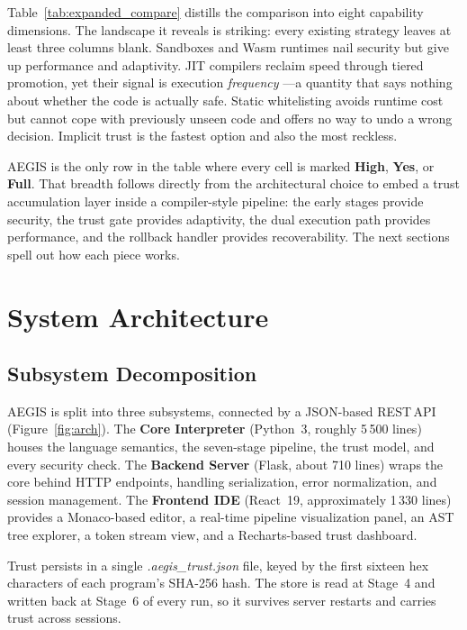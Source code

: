 \documentclass[conference]{IEEEtran}
\begin{document}
Table~\ref{tab:expanded_compare} distills the comparison into
eight capability dimensions.  The landscape it reveals is
striking: every existing strategy leaves at least three columns
blank.  Sandboxes and Wasm runtimes nail security but give up
performance and adaptivity.  JIT compilers reclaim speed through
tiered promotion, yet their signal is execution \emph{frequency}
---a quantity that says nothing about whether the code is
actually safe.  Static whitelisting avoids runtime cost but
cannot cope with previously unseen code and offers no way to
undo a wrong decision.  Implicit trust is the fastest option
and also the most reckless.

AEGIS is the only row in the table where every cell is marked
\textbf{High}, \textbf{Yes}, or \textbf{Full}.  That breadth
follows directly from the architectural choice to embed a trust
accumulation layer inside a compiler-style pipeline: the early
stages provide security, the trust gate provides adaptivity,
the dual execution path provides performance, and the rollback
handler provides recoverability.  The next sections spell out
how each piece works.

\section{System Architecture}
\label{sec:arch}

\subsection{Subsystem Decomposition}

AEGIS is split into three subsystems, connected by a JSON-based
REST\,API (Figure~\ref{fig:arch}).  The \textbf{Core Interpreter}
(Python~3, roughly 5\,500 lines) houses the language semantics,
the seven-stage pipeline, the trust model, and every security
check.  The \textbf{Backend Server} (Flask, about 710 lines)
wraps the core behind HTTP endpoints, handling serialization,
error normalization, and session management.  The
\textbf{Frontend IDE} (React~19, approximately 1\,330 lines)
provides a Monaco-based editor, a real-time pipeline
visualization panel, an AST tree explorer, a token stream view,
and a Recharts-based trust dashboard.

Trust persists in a single \textit{.aegis\_trust.json} file,
keyed by the first sixteen hex characters of each program's
SHA-256 hash.  The store is read at Stage~4 and written back
at Stage~6 of every run, so it survives server restarts and
carries trust across sessions.
\end{document}
